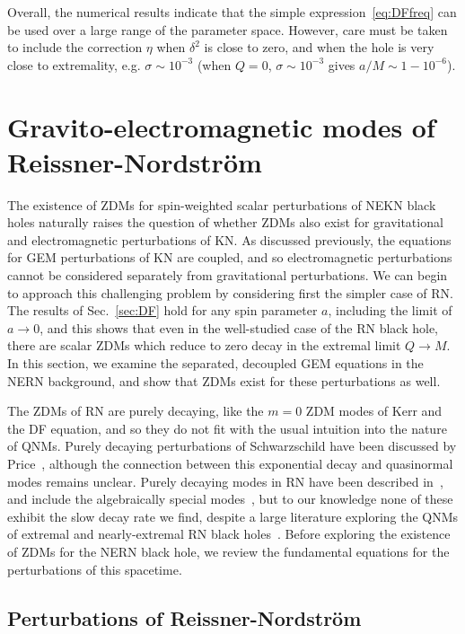 \begin{refsection}
Overall, the numerical results indicate that the simple expression~\eqref{eq:DFfreq} can be used over a large range of the parameter space. However, care must be taken to include the correction $\eta$ when $\delta^2$ is close to zero, and when the hole is very close to extremality, e.g. $\sigma \sim 10^{-3}$ (when $Q = 0$, $\sigma \sim 10^{-3}$ gives $a/M \sim 1 - 10^{-6}$).


\section{Gravito-electromagnetic modes of Reissner-Nordstr\"{o}m}
\label{sec:RN}

The existence of ZDMs for spin-weighted scalar perturbations of NEKN black holes naturally raises the question of whether ZDMs also exist for gravitational and electromagnetic perturbations of KN.
As discussed previously, the equations for GEM perturbations of KN are coupled, and so electromagnetic perturbations cannot be considered separately from gravitational perturbations.
We can begin to approach this challenging problem by considering first the simpler case of RN.
The results of Sec.~\ref{sec:DF} hold for any spin parameter $a$, including the limit of $a \to 0$, and this shows that even in the well-studied case of the RN black hole, there are scalar ZDMs which reduce to zero decay in the extremal limit $Q \to M$.
In this section, we examine the separated, decoupled GEM equations in the NERN background, and show that ZDMs exist for these perturbations as well.

The ZDMs of RN are purely decaying, like the $m=0$ ZDM modes of Kerr and the DF equation, and so they do not fit with the usual intuition into the nature of QNMs. 
Purely decaying perturbations of Schwarzschild have been discussed by Price~\cite{Price:1971fb,Price:1972pw,wheeler1972magic}, although the connection between this exponential decay and quasinormal modes remains unclear.
Purely decaying modes in RN have been described in~\cite{Andersson:1996xw,Andersson:2003fh}, and include the algebraically special modes~\cite{Chandra:1984a}, but to our knowledge none of these exhibit the slow decay rate we find, despite a large literature exploring the QNMs of extremal and nearly-extremal RN black holes~\cite{LeaverRN,Onozawa:1995vu,Berti2009}.
Before exploring the existence of ZDMs for the NERN black hole, we review the fundamental equations for the perturbations of this spacetime.

\subsection{Perturbations of Reissner-Nordstr\"{o}m}


\end{refsection}
